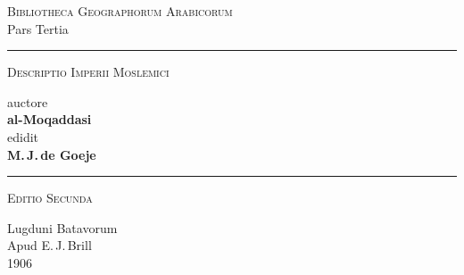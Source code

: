 \documentclass[11pt,a4paper]{article}
\newcommand{\shortline}{\noindent\rule{0.5\textwidth}{0.4pt}\par}
\begin{document}



\thispagestyle{empty}

\begin{center}

\vspace*{3cm}



{\Large\textsc{Bibliotheca Geographorum Arabicorum}}\\[0.5cm]

{\small Pars Tertia}\\[2cm]



\shortline

\vspace{1cm}



{\LARGE\scshape Descriptio Imperii Moslemici}\\[0.5cm]

\vspace{0.5cm}

{\Large auctore}\\[0.5cm]

{\LARGE\bfseries al-Moqaddasi}\\[0.3cm]

{\large edidit}\\[0.3cm]

{\Large\bfseries M.\,J.\,de Goeje}\\[1cm]



\shortline

\vspace{1cm}



{\large\textsc{Editio Secunda}}\\[1.5cm]



\vfill



{\large Lugduni Batavorum}\\

{\large Apud E.\,J.\,Brill}\\

{\large 1906}\\



\vspace{2cm}



\end{center}
\end{document}
